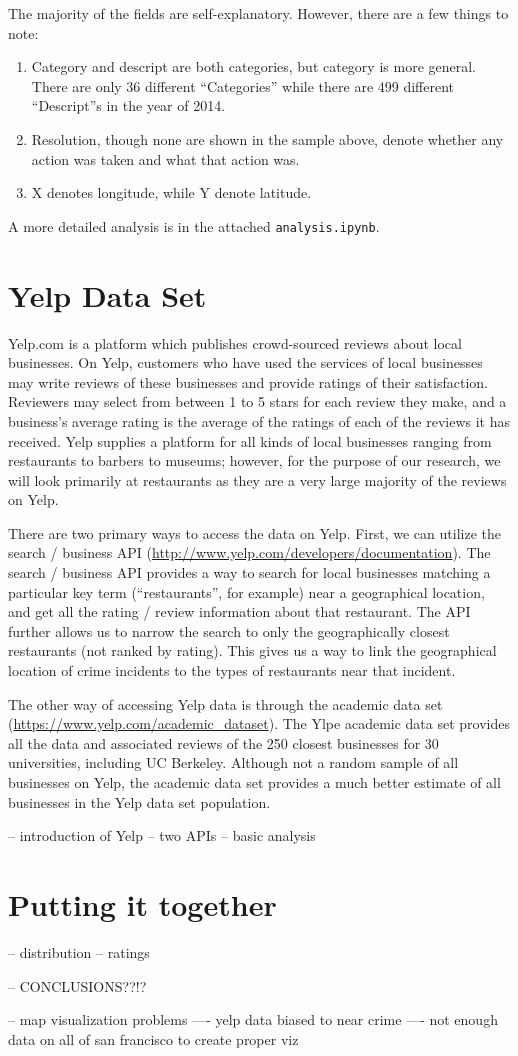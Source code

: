 \documentclass{article}
\begin{document}
The majority of the fields are self-explanatory. However, there are a few
things to note:
\begin{enumerate}
\item Category and descript are both categories, but category is more
  general. There are only 36 different ``Categories'' while there are 499
  different ``Descript''s in the year of 2014.
\item Resolution, though none are shown in the sample above, denote whether
  any action was taken and what that action was.
\item X denotes longitude, while Y denote latitude.
\end{enumerate}

A more detailed analysis is in the attached \texttt{analysis.ipynb}.

\section{Yelp Data Set}

Yelp.com is a platform which publishes crowd-sourced reviews about local
businesses. On Yelp, customers who have used the services of local
businesses may write reviews of these businesses and provide ratings of
their satisfaction. Reviewers may select from between 1 to 5 stars for each
review they make, and a business's average rating is the average of the
ratings of each of the reviews it has received. Yelp supplies a platform
for all kinds of local businesses ranging from restaurants to barbers to
museums; however, for the purpose of our research, we will look primarily
at restaurants as they are a very large majority of the reviews on Yelp.

There are two primary ways to access the data on Yelp. First, we can
utilize the search / business API
(\url{http://www.yelp.com/developers/documentation}). The search / business
API provides a way to search for local businesses matching a particular key
term (``restaurants'', for example) near a geographical location, and get
all the rating / review information about that restaurant. The API further
allows us to narrow the search to only the geographically closest
restaurants (not ranked by rating). This gives us a way to link the
geographical location of crime incidents to the types of restaurants near
that incident.

The other way of accessing Yelp data is through the academic data set
(\url{https://www.yelp.com/academic_dataset}). The Ylpe academic data set
provides all the data and associated reviews of the 250 closest businesses
for 30 universities, including UC Berkeley. Although not a random sample of
all businesses on Yelp, the academic data set provides a much better
estimate of all businesses in the Yelp data set population.

-- introduction of Yelp
-- two APIs
-- basic analysis

\section{Putting it together}

-- distribution
-- ratings

-- CONCLUSIONS??!?

-- map visualization problems
---- yelp data biased to near crime
---- not enough data on all of san francisco to create proper viz
\end{document}
